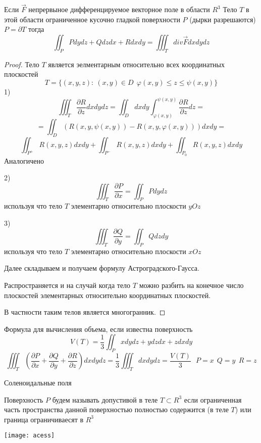 \begin{theorem}
  Если $\vec F$ непрервыное дифференцируемое векторное поле в области $R^3$
  Тело $T$ в этой области ограниченное кусочно гладкой поверхности $P$
  (дырки разрешаются) $P = \partial T$ тогда
  $$
  \iint_P P dy dz + Q dz dx + R dx dy =
  \iiint_T div \vec F dxdydz
  $$
\end{theorem}

\begin{proof}
  Тело $T$ является эелментарным относительно всех координатных плоскостей
  $$
  T = \{(x, y,z): ~ (x,y) \in D ~~ \varphi(x,y) \le z \le \psi(x,y)\}
  $$
  1)
  $$
  \iiint_T \frac{\partial R}{\partial z} dxdydz = \iint_D dxdy
  \int^{\psi(x,y)}_{\varphi(x,y)} \frac{\partial R}{\partial z} dz =
  $$
  $$
  = \iint_D (R(x,y, \psi(x,y)) - R(x,y, \varphi(x,y))) dx dy =
  $$
  $$
  \iint_{P^+} R(x,y,z) dx dy + \iint_{P^-} R(x,y,z) dxdy + \iint_{P_0}
  R(x,y,z) dxdy
  $$
  Аналогичено

  2)
  $$
  \iiint_T \frac{\partial P}{\partial x} = \iint_P P dydz
  $$
  используя что тело $T$ элементарно относительно плоскости $yOz$

  3)
  $$
  \iiint_T \frac{\partial Q}{\partial y} = \iint_P Q dzdy
  $$
  используя что тело $T$ элементарно относительно плоскости $xOz$

  Далее складываем и получаем формулу Астроградского-Гаусса.

  Распространяется и на случай когда тело $T$ можно разбить на конечное число
  плоскостей элементарных относительно координатных плоскостей.

  В частности таким телов является многогранник.
\end{proof}

\begin{block}[Следствие]
  Формула для вычисления объема, если известна поверхность
  $$
  V(T) = \frac{1}{3} \iint_P xdydz + ydzdx + zdxdy
  $$
  $$
  \iiint_T \left( \frac{\partial P}{\partial x} + \frac{\partial Q}{\partial y}
  + \frac{\partial R}{\partial z} \right) dxdydz = \frac{1}{3} \iiint_T dxdydz =
  \frac{V(T)}{3} ~~~ P = x ~~ Q = y ~~ R = z
  $$
\end{block}

\begin{title}[\Large]
  Соленоидальные поля
\end{title}

\begin{define}[допустивости]
  Поверхность $P$ будем называть допустивой в теле $T \subset R^3$ если
  ограниченная часть пространства данной поверхностью полностью содержится
  (в теле $T$) или граница ограничиваесят в $R^3$

  \texttt{[image: acess]}
\end{define}

